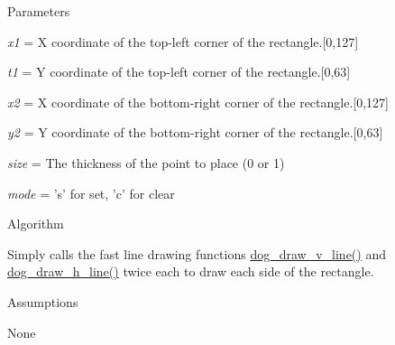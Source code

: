 \begin{DoxyParagraph}{Parameters}

\begin{DoxyItemize}
\item {\itshape x1} = X coordinate of the top-\/left corner of the rectangle.\mbox{[}0,127\mbox{]}
\item {\itshape t1} = Y coordinate of the top-\/left corner of the rectangle.\mbox{[}0,63\mbox{]}
\item {\itshape x2} = X coordinate of the bottom-\/right corner of the rectangle.\mbox{[}0,127\mbox{]}
\item {\itshape y2} = Y coordinate of the bottom-\/right corner of the rectangle.\mbox{[}0,63\mbox{]}
\item {\itshape size} = The thickness of the point to place (0 or 1)
\item {\itshape mode} = 's' for set, 'c' for clear
\end{DoxyItemize}
\end{DoxyParagraph}
\begin{DoxyParagraph}{Algorithm}

\begin{DoxyItemize}
\item Simply calls the fast line drawing functions \hyperlink{group___d_o_g_m128__lines_gae41da7e6bda7b37f0ad7eb037b64ea26}{dog\-\_\-draw\-\_\-v\-\_\-line()} and \hyperlink{group___d_o_g_m128__lines_gad33474648d863d3e2f569d5c7667bbe8}{dog\-\_\-draw\-\_\-h\-\_\-line()} twice each to draw each side of the rectangle.
\end{DoxyItemize}
\end{DoxyParagraph}
\begin{DoxyParagraph}{Assumptions}

\begin{DoxyItemize}
\item None 
\end{DoxyItemize}
\end{DoxyParagraph}
